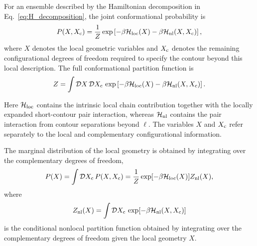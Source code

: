 \documentclass[11pt]{article}
\begin{document}
For an ensemble described by the Hamiltonian decomposition in Eq.~\eqref{eq:H_decomposition}, the joint conformational probability is
\begin{equation}
P(X,X_{\rm c})
=
\frac{1}{Z}
\exp\left[
-\beta\mathcal H_{\rm loc}(X)
-\beta\mathcal H_{\rm nl}(X,X_{\rm c})
\right],
\end{equation}
where \(X\) denotes the local geometric variables and \(X_{\rm c}\) denotes the remaining configurational degrees of freedom required to specify the contour beyond this local description. The full conformational partition function is
\begin{equation}
Z
=
\int\mathcal D X\,\mathcal D X_{\rm c}\,
\exp\left[
-\beta\mathcal H_{\rm loc}(X)
-\beta\mathcal H_{\rm nl}(X,X_{\rm c})
\right].
\end{equation}

Here \(\mathcal H_{\rm loc}\) contains the intrinsic local chain contribution together with the locally expanded short-contour pair interaction, whereas \(\mathcal H_{\rm nl}\) contains the pair interaction from contour separations beyond \(\ell\). The variables \(X\) and \(X_{\rm c}\) refer separately to the local and complementary configurational information.

The marginal distribution of the local geometry is obtained by integrating over the complementary degrees of freedom,
\begin{equation}
P(X)
=
\int\mathcal D X_{\rm c}\,P(X,X_{\rm c})
=
\frac{1}{Z}
\exp[-\beta\mathcal H_{\rm loc}(X)]
Z_{\rm nl}(X),
\end{equation}
where
\begin{equation}
Z_{\rm nl}(X)
=
\int\mathcal D X_{\rm c}\,
\exp[-\beta\mathcal H_{\rm nl}(X,X_{\rm c})]
\label{eq:Znl}
\end{equation}
is the conditional nonlocal partition function obtained by integrating over the complementary degrees of freedom given the local geometry \(X\).
\end{document}
